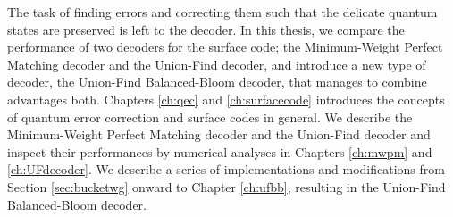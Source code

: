 The task of finding errors and correcting them such that the delicate quantum states are preserved is left to the decoder. In this thesis, we compare the performance of two decoders for the surface code; the Minimum-Weight Perfect Matching decoder and the Union-Find decoder, and introduce a new type of decoder, the Union-Find Balanced-Bloom decoder, that manages to combine advantages both. Chapters \ref{ch:qec} and \ref{ch:surfacecode} introduces the concepts of quantum error correction and surface codes in general. We describe the Minimum-Weight Perfect Matching decoder and the Union-Find decoder and inspect their performances by numerical analyses in Chapters \ref{ch:mwpm} and \ref{ch:UFdecoder}. We describe a series of implementations and modifications from Section \ref{sec:bucketwg} onward to Chapter \ref{ch:ufbb}, resulting in the Union-Find Balanced-Bloom decoder. 